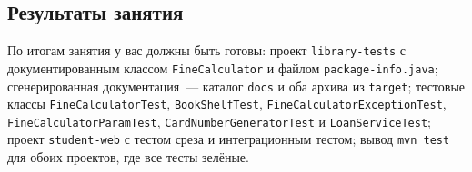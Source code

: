\subsection*{Результаты занятия}

По итогам занятия у вас должны быть готовы: проект \texttt{library-tests} с документированным классом \texttt{FineCalculator} и файлом \texttt{package-info.java}; сгенерированная документация~--- каталог \texttt{docs} и оба архива из \texttt{target}; тестовые классы \texttt{FineCalculatorTest}, \texttt{BookShelfTest}, \texttt{FineCalculatorExceptionTest}, \texttt{FineCalculatorParamTest}, \texttt{CardNumberGeneratorTest} и \texttt{LoanServiceTest}; проект \texttt{student-web} с тестом среза и интеграционным тестом; вывод \texttt{mvn test} для обоих проектов, где все тесты зелёные.

\kontrolvoprosy

